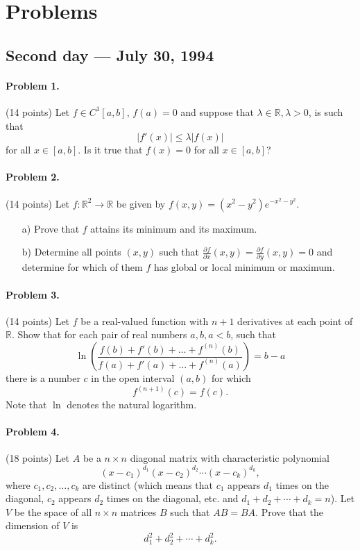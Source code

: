 \documentclass{article}
\begin{document}
\pagestyle{plain}

\section*{Problems}

\subsection*{Second day — July 30, 1994}

\paragraph{Problem 1.} (14 points)
Let $f \in C^1[a, b]$, $f(a) = 0$ and suppose that $\lambda \in \mathbb{R}, \lambda > 0$, is such that
\[
|f'(x)| \leq \lambda|f(x)|
\]
for all $x \in [a, b]$. Is it true that $f(x) = 0$ for all $x \in [a, b]$?

\paragraph{Problem 2.} (14 points)
Let $f : \mathbb{R}^2 \to \mathbb{R}$ be given by $f(x,y) = (x^2 - y^2)e^{-x^2-y^2}$.
\begin{itemize}
    \item[a)] Prove that $f$ attains its minimum and its maximum.
    \item[b)] Determine all points $(x, y)$ such that $\frac{\partial f}{\partial x}(x, y) = \frac{\partial f}{\partial y}(x, y) = 0$ and determine for which of them $f$ has global or local minimum or maximum.
\end{itemize}

\paragraph{Problem 3.} (14 points)
Let $f$ be a real-valued function with $n + 1$ derivatives
at each point of $\mathbb{R}$.
Show that for each pair of real numbers $a, b, a < b$, such that
\[
\ln \left( \frac{f(b) + f'(b) + \ldots + f^{(n)}(b)}{f(a) + f'(a) + \ldots + f^{(n)}(a)} \right) = b - a
\]
there is a number $c$ in the open interval $(a, b)$ for which
\[
f^{(n+1)}(c) = f(c).
\]
Note that $\ln$ denotes the natural logarithm.

\paragraph{Problem 4.} (18 points)
Let $A$ be a $n \times n$ diagonal matrix with characteristic polynomial
\[
(x - c_1)^{d_1}(x - c_2)^{d_2} \cdots (x - c_k)^{d_k},
\]
where $c_1, c_2, \ldots, c_k$ are distinct
(which means that $c_1$ appears $d_1$ times on the diagonal,
$c_2$ appears $d_2$ times on the diagonal, etc. and $d_1 + d_2 + \cdots + d_k = n$).
Let $V$ be the space of all $n \times n$ matrices $B$ such that $AB = BA$.
Prove that the dimension of $V$ is
\[
d_1^2 + d_2^2 + \cdots + d_k^2.
\]
\end{document}
